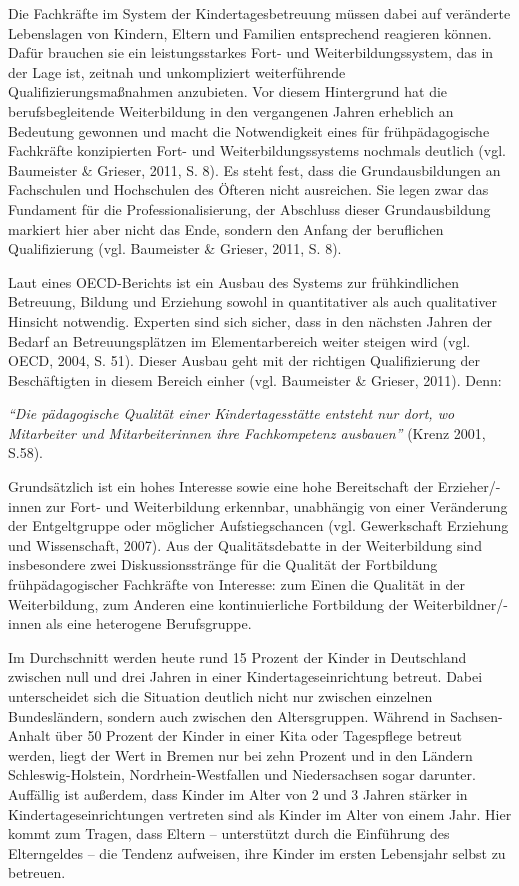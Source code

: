 \documentclass[12pt,a4paper]{article}
\begin{document}
	Die Fachkräfte im System der Kindertagesbetreuung müssen dabei auf veränderte Lebenslagen von Kindern, Eltern und Familien entsprechend reagieren können. Dafür brauchen sie ein leistungsstarkes Fort- und Weiterbildungssystem, das in der Lage ist, zeitnah und unkompliziert weiterführende Qualifizierungsmaßnahmen anzubieten. Vor diesem Hintergrund hat die  berufsbegleitende Weiterbildung in den vergangenen Jahren erheblich an Bedeutung gewonnen und macht die Notwendigkeit eines für frühpädagogische Fachkräfte konzipierten Fort- und Weiterbildungssystems nochmals deutlich (vgl. Baumeister \& Grieser, 2011, S. 8).  Es steht fest, dass die Grundausbildungen an Fachschulen und Hochschulen des Öfteren nicht ausreichen. Sie legen zwar das Fundament für die Professionalisierung, der Abschluss dieser Grundausbildung markiert hier aber nicht das Ende, sondern den Anfang der beruflichen Qualifizierung (vgl. Baumeister \& Grieser, 2011, S. 8). 
	
	Laut eines OECD-Berichts ist ein Ausbau des Systems zur frühkindlichen Betreuung, Bildung und Erziehung sowohl in quantitativer als auch qualitativer Hinsicht notwendig. Experten sind sich sicher, dass in den nächsten Jahren der Bedarf an Betreuungsplätzen im Elementarbereich weiter steigen wird (vgl. OECD, 2004, S. 51). Dieser Ausbau geht mit der richtigen Qualifizierung der Beschäftigten in diesem Bereich einher (vgl. Baumeister \& Grieser, 2011). Denn:

\textit{"`Die pädagogische Qualität einer Kindertagesstätte entsteht nur dort, wo Mitarbeiter und Mitarbeiterinnen ihre Fachkompetenz ausbauen"'} (Krenz 2001, S.58).

Grundsätzlich ist ein hohes Interesse sowie eine hohe Bereitschaft der Erzieher/-innen zur Fort- und Weiterbildung erkennbar, unabhängig von einer Veränderung der Entgeltgruppe oder möglicher Aufstiegschancen (vgl. Gewerkschaft Erziehung und Wissenschaft, 2007). Aus der Qualitätsdebatte in der Weiterbildung sind insbesondere zwei Diskussionsstränge für die Qua\-li\-tät der Fortbildung frühpädagogischer Fachkräfte von Interesse: zum Einen die Qualität in der Weiterbildung, zum Anderen eine kontinuierliche Fortbildung der Weiterbildner/-innen als eine heterogene Berufsgruppe. 

Im Durchschnitt werden heute rund 15 Prozent der Kinder in Deutschland zwischen null und drei Jahren in einer Kindertageseinrichtung betreut. Dabei unterscheidet sich die Situation deutlich nicht nur zwischen einzelnen Bundesländern, sondern auch zwischen den Altersgruppen. Während in Sachsen-Anhalt über 50 Prozent der Kinder in einer Kita oder Tagespflege betreut werden, liegt der Wert in Bremen nur bei zehn Prozent und in den Ländern Schleswig-Holstein, Nordrhein-Westfallen und Niedersachsen sogar darunter. Auffällig ist außerdem, dass Kinder im Alter von 2 und 3 Jahren stärker in Kindertageseinrichtungen vertreten sind als Kinder im Alter von einem Jahr. Hier kommt zum Tragen, dass Eltern – unterstützt durch die Einführung des Elterngeldes – die Tendenz aufweisen, ihre Kinder im ersten Lebensjahr selbst zu betreuen. 
\end{document}
